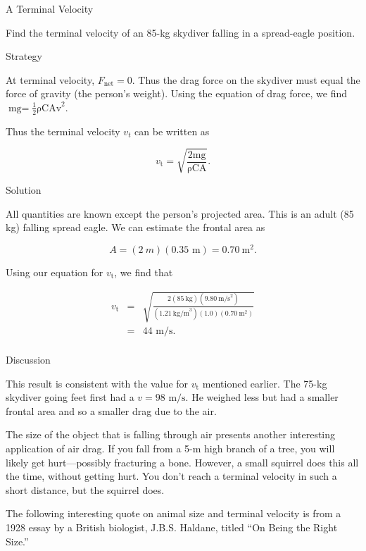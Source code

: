 \documentclass[
]{book}
\begin{document}
\hypertarget{fs-id1165298642932}{}
A Terminal Velocity

Find the terminal velocity of an 85-kg skydiver falling in a
spread-eagle position.

{Strategy}

At terminal velocity, \({F_{\text{net}} = 0}{}\). Thus the drag force on
the skydiver must equal the force of gravity (the person's weight).
Using the equation of drag force, we find
\({{\text{mg} =}\frac{1}{2}\text{ρCAv}^{2}}{}\).

Thus the terminal velocity \(v_{t}{}\) can be written as

\leavevmode{}%
\[{{v_{\text{t}} = \sqrt{\frac{2\text{mg}}{\text{ρCA}}}}.}{}\]

{Solution}

All quantities are known except the person's projected area. This is an
adult (85 kg) falling spread eagle. We can estimate the frontal area as

\leavevmode{}%
\[{{A = (2\ m)(0\text{.}\text{35\ m}) = 0\text{.}\text{70}\ \text{m}^{2}}.}{}\]

Using our equation for \(v_{\text{t}}{}\), we find that

\leavevmode{}%
\[\begin{array}{lll}
v_{\text{t}} & = & \sqrt{\frac{2(\text{85}\ \text{kg})(9.80\ \text{m/s}^{2})}{(1.21\ \text{kg/m}^{3})(1.0)(0.70\ \text{m}^{2})}} \\
 & = & \text{44\ m/s.} \\
\end{array}\]

{Discussion}

This result is consistent with the value for \(v_{\text{t}}{}\) mentioned
earlier. The 75-kg skydiver going feet first had a
\({v = \text{98\ m}/\text{s}}{}\). He weighed less but had a smaller
frontal area and so a smaller drag due to the air.

The size of the object that is falling through air presents another
interesting application of air drag. If you fall from a 5-m high branch
of a tree, you will likely get hurt---possibly fracturing a bone.
However, a small squirrel does this all the time, without getting hurt.
You don't reach a terminal velocity in such a short distance, but the
squirrel does.

The following interesting quote on animal size and terminal velocity is
from a 1928 essay by a British biologist, J.B.S. Haldane, titled ``On
Being the Right Size.''
\end{document}
